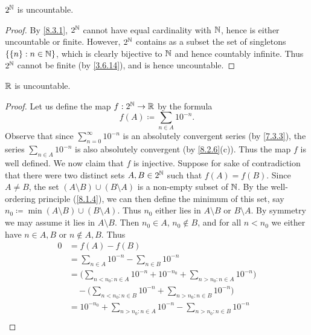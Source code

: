 \begin{cor}\label{8.3.3}
  \(2^{\mathbb{N}}\) is uncountable.
\end{cor}

\begin{proof}
  By \cref{8.3.1}, \(2^{\mathbb{N}}\) cannot have equal cardinality with \(\mathbb{N}\), hence is either uncountable or finite.
  However, \(2^{\mathbb{N}}\) contains as a subset the set of singletons \(\{\{n\} : n \in \mathbb{N}\}\), which is clearly bijective to \(\mathbb{N}\) and hence countably infinite.
  Thus \(2^{\mathbb{N}}\) cannot be finite (by \cref{3.6.14}), and is hence uncountable.
\end{proof}

\begin{cor}\label{8.3.4}
  \(\mathbb{R}\) is uncountable.
\end{cor}

\begin{proof}
  Let us define the map \(f : 2^{\mathbb{N}} \to \mathbb{R}\) by the formula
  \[
    f(A) \coloneqq \sum_{n \in A} 10^{-n}.
  \]
  Observe that since \(\sum_{n = 0}^\infty 10^{-n}\) is an absolutely convergent series (by \cref{7.3.3}), the series \(\sum_{n \in A} 10^{-n}\) is also absolutely convergent (by \cref{8.2.6}(c)).
  Thus the map \(f\)  is well defined.
  We now claim that \(f\) is injective.
  Suppose for sake of contradiction that there were two distinct sets \(A, B \in 2^{\mathbb{N}}\) such that \(f(A) = f(B)\).
  Since \(A \neq B\), the set \((A \setminus B) \cup (B \setminus A)\) is a non-empty subset of \(\mathbb{N}\).
  By the well-ordering principle (\cref{8.1.4}), we can then define the minimum of this set, say \(n_0 \coloneqq \min(A \setminus B) \cup (B \setminus A)\).
  Thus \(n_0\) either lies in \(A \setminus B\) or \(B \setminus A\).
  By symmetry we may assume it lies in \(A \setminus B\).
  Then \(n_0 \in A\), \(n_0 \notin B\), and for all \(n < n_0\) we either have \(n \in A, B\) or \(n \notin A, B\).
  Thus
  \begin{align*}
    0 & = f(A) - f(B)                                                                                 \\
      & = \sum_{n \in A} 10^{-n} - \sum_{n \in B} 10^{-n}                                             \\
      & = \Bigg(\sum_{n < n_0 : n \in A} 10^{-n} + 10^{-n_0} + \sum_{n > n_0 : n \in A} 10^{-n}\Bigg) \\
      & \quad - \Bigg(\sum_{n < n_0 : n \in B} 10^{-n} + \sum_{n > n_0 : n \in B} 10^{-n}\Bigg)       \\
      & = 10^{-n_0} + \sum_{n > n_0 : n \in A} 10^{-n} - \sum_{n > n_0 : n \in B} 10^{-n}             \\

\end{align*}
\end{proof}
